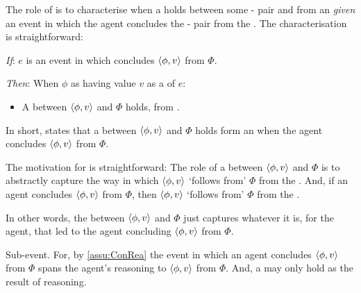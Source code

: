 \begin{note}
  The role of \supportI{} is to characterise when a \ros{} holds between some - pair and \pool{} from an \agpe{} \emph{given} an event in which the agent concludes the - pair from the \pool{}.
  The characterisation is straightforward:

  \begin{idea}[\supportI{}]
    \label{idea:support}
    \vspace{-\baselineskip}
    \begin{itenum}
    \item[\emph{If}:]
      \(e\) is an event in which \vAgent{} concludes \(\langle \phi, v \rangle\) from \(\Phi\).
    \item[\emph{Then}:]
      When \vAgent{}  \(\phi\) as having value \(v\) as a  of \(e\):
      \begin{itemize}
      \item
        A \emph{\ros{}} between \(\langle \phi, v \rangle\) and \(\Phi\) holds, from .
      \end{itemize}
    \end{itenum}
    \vspace{-\baselineskip}
  \end{idea}

  \noindent%
  In short, \supportI{} states that a \ros{} between \(\langle \phi, v \rangle\) and \(\Phi\) holds form an \agpe{} when the agent concludes \(\langle \phi, v \rangle\) from \(\Phi\).

  The motivation for \supportI{} is straightforward:
  The role of  a \ros{} between \(\langle \phi, v \rangle\) and \(\Phi\) is to abstractly capture the way in which \(\langle \phi, v \rangle\) `follows from' \(\Phi\) from the \agpe{}.
  And, if an agent concludes \(\langle \phi, v \rangle\) from \(\Phi\), then \(\langle \phi, v \rangle\) `follows from' \(\Phi\) from the \agpe{}.

  In other words, the \ros{} between \(\langle \phi, v \rangle\) and \(\Phi\) just captures whatever it is, for the agent, that led to the agent concluding \(\langle \phi, v \rangle\) from \(\Phi\).
\end{note}


\begin{note}
  Sub-event.
  For, by \autoref{assu:ConRea} the event in which an agent concludes \(\langle \phi, v \rangle\) from \(\Phi\) spans the agent's reasoning to \(\langle \phi, v \rangle\) from \(\Phi\).
  And, a \ros{} may only hold as the result of reasoning.
\end{note}


